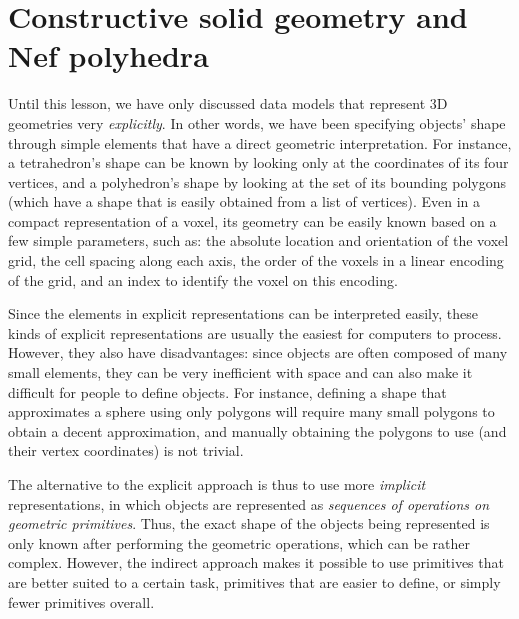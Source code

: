 
\setchapterpreamble[u]{\margintoc}

\graphicspath{{csg_nef/}}
\renewcommand*{\thelesson}{3.1}

\chapter{Constructive solid geometry and Nef polyhedra}%
\label{chap:csg_nef}


Until this lesson, we have only discussed data models that represent 3D geometries very \emph{explicitly}.
In other words, we have been specifying objects' shape through simple elements that have a direct geometric interpretation.
For instance, a tetrahedron's shape can be known by looking only at the coordinates of its four vertices, and a polyhedron's shape by looking at the set of its bounding polygons (which have a shape that is easily obtained from a list of vertices).
Even in a compact representation of a voxel, its geometry can be easily known based on a few simple parameters, such as: the absolute location and orientation of the voxel grid, the cell spacing along each axis, the order of the voxels in a linear encoding of the grid, and an index to identify the voxel on this encoding.


Since the elements in explicit representations can be interpreted easily, these kinds of explicit representations are usually the easiest for computers to process.
However, they also have disadvantages: since objects are often composed of many small elements, they can be very inefficient with space and can also make it difficult for people to define objects.
For instance, defining a shape that approximates a sphere using only polygons will require many small polygons to obtain a decent approximation, and manually obtaining the polygons to use (and their vertex coordinates) is not trivial.


The alternative to the explicit approach is thus to use more \emph{implicit} representations, in which objects are represented as \emph{sequences of operations on geometric primitives}.
Thus, the exact shape of the objects being represented is only known after performing the geometric operations, which can be rather complex.
However, the indirect approach makes it possible to use primitives that are better suited to a certain task, primitives that are easier to define, or simply fewer primitives overall.

